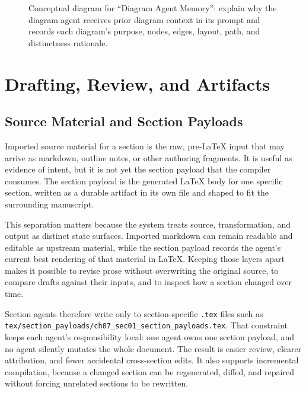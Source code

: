 \documentclass[11pt]{article}
\begin{document}
\begin{figure}[htbp]
\centering

\caption{Conceptual diagram for ``Diagram Agent Memory'': explain why the diagram agent receives prior diagram context in its prompt and records each diagram's purpose, nodes, edges, layout, path, and distinctness rationale.}
\end{figure}



\section{Drafting, Review, and Artifacts}

\subsection{Source Material and Section Payloads}


Imported source material for a section is the raw, pre-\LaTeX{} input that may arrive as markdown, outline notes, or other authoring fragments. It is useful as evidence of intent, but it is not yet the section payload that the compiler consumes. The section payload is the generated \LaTeX{} body for one specific section, written as a durable artifact in its own file and shaped to fit the surrounding manuscript.

This separation matters because the system treats source, transformation, and output as distinct state surfaces. Imported markdown can remain readable and editable as upstream material, while the section payload records the agent's current best rendering of that material in \LaTeX{}. Keeping those layers apart makes it possible to revise prose without overwriting the original source, to compare drafts against their inputs, and to inspect how a section changed over time.

Section agents therefore write only to section-specific \texttt{.tex} files such as \texttt{tex/section\_payloads/ch07\_sec01\_section\_payloads.tex}. That constraint keeps each agent's responsibility local: one agent owns one section payload, and no agent silently mutates the whole document. The result is easier review, clearer attribution, and fewer accidental cross-section edits. It also supports incremental compilation, because a changed section can be regenerated, diffed, and repaired without forcing unrelated sections to be rewritten.
\end{document}
